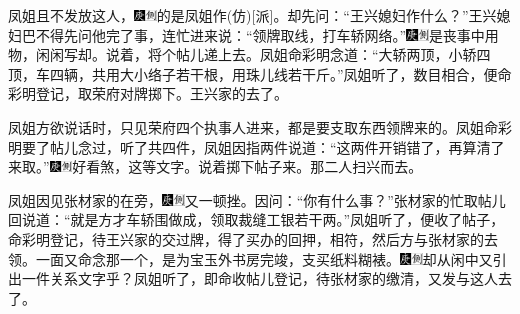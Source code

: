 凤姐且不发放这人，{{\includegraphics[width=3mm]{../Images/00004}\includegraphics[width=3mm]{../Images/00011}\footnotesize \kaishu 的是凤姐作{(仿)}{[}派{]}。}}却先问：“王兴媳妇作什么？”王兴媳妇巴不得先问他完了事，连忙进来说：“领牌取线，打车轿网络。”{\includegraphics[width=3mm]{../Images/00004}\includegraphics[width=3mm]{../Images/00011}\footnotesize \kaishu 是丧事中用物，闲闲写却。}说着，将个帖儿递上去。凤姐命彩明念道：“大轿两顶，小轿四顶，车四辆，共用大小络子若干根，用珠儿线若干斤。”凤姐听了，数目相合，便命彩明登记，取荣府对牌掷下。王兴家的去了。

凤姐方欲说话时，只见荣府四个执事人进来，都是要支取东西领牌来的。凤姐命彩明要了帖儿念过，听了共四件，凤姐因指两件说道：“这两件开销错了，再算清了来取。”{\includegraphics[width=3mm]{../Images/00004}\includegraphics[width=3mm]{../Images/00011}\footnotesize \kaishu 好看煞，这等文字。}说着掷下帖子来。那二人扫兴而去。

凤姐因见张材家的在旁，{\includegraphics[width=3mm]{../Images/00004}\includegraphics[width=3mm]{../Images/00011}\footnotesize \kaishu 又一顿挫。}因问：“你有什么事？”张材家的忙取帖儿回说道：“就是方才车轿围做成，领取裁缝工银若干两。”凤姐听了，便收了帖子，命彩明登记，待王兴家的交过牌，得了买办的回押，相符，然后方与张材家的去领。一面又命念那一个，是为宝玉外书房完竣，支买纸料糊裱。{\includegraphics[width=3mm]{../Images/00004}\includegraphics[width=3mm]{../Images/00011}\footnotesize \kaishu 却从闲中又引出一件关系文字乎？}凤姐听了，即命收帖儿登记，待张材家的缴清，又发与这人去了。


